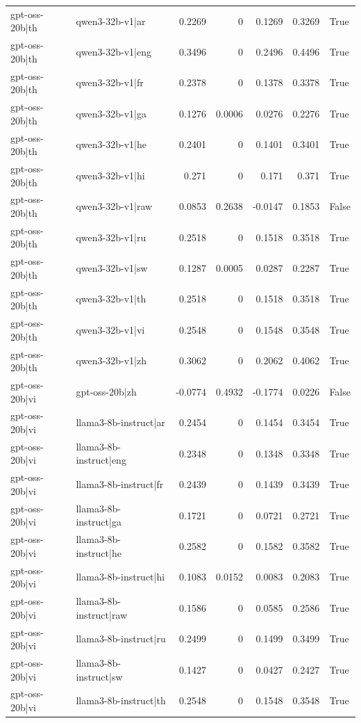 \begin{table}
\begin{tabular}{l l r r r r l}
gpt-oss-20b|th & qwen3-32b-v1|ar & 0.2269 & 0 & 0.1269 & 0.3269 & True \\
gpt-oss-20b|th & qwen3-32b-v1|eng & 0.3496 & 0 & 0.2496 & 0.4496 & True \\
gpt-oss-20b|th & qwen3-32b-v1|fr & 0.2378 & 0 & 0.1378 & 0.3378 & True \\
gpt-oss-20b|th & qwen3-32b-v1|ga & 0.1276 & 0.0006 & 0.0276 & 0.2276 & True \\
gpt-oss-20b|th & qwen3-32b-v1|he & 0.2401 & 0 & 0.1401 & 0.3401 & True \\
gpt-oss-20b|th & qwen3-32b-v1|hi & 0.271 & 0 & 0.171 & 0.371 & True \\
gpt-oss-20b|th & qwen3-32b-v1|raw & 0.0853 & 0.2638 & -0.0147 & 0.1853 & False \\
gpt-oss-20b|th & qwen3-32b-v1|ru & 0.2518 & 0 & 0.1518 & 0.3518 & True \\
gpt-oss-20b|th & qwen3-32b-v1|sw & 0.1287 & 0.0005 & 0.0287 & 0.2287 & True \\
gpt-oss-20b|th & qwen3-32b-v1|th & 0.2518 & 0 & 0.1518 & 0.3518 & True \\
gpt-oss-20b|th & qwen3-32b-v1|vi & 0.2548 & 0 & 0.1548 & 0.3548 & True \\
gpt-oss-20b|th & qwen3-32b-v1|zh & 0.3062 & 0 & 0.2062 & 0.4062 & True \\
gpt-oss-20b|vi & gpt-oss-20b|zh & -0.0774 & 0.4932 & -0.1774 & 0.0226 & False \\
gpt-oss-20b|vi & llama3-8b-instruct|ar & 0.2454 & 0 & 0.1454 & 0.3454 & True \\
gpt-oss-20b|vi & llama3-8b-instruct|eng & 0.2348 & 0 & 0.1348 & 0.3348 & True \\
gpt-oss-20b|vi & llama3-8b-instruct|fr & 0.2439 & 0 & 0.1439 & 0.3439 & True \\
gpt-oss-20b|vi & llama3-8b-instruct|ga & 0.1721 & 0 & 0.0721 & 0.2721 & True \\
gpt-oss-20b|vi & llama3-8b-instruct|he & 0.2582 & 0 & 0.1582 & 0.3582 & True \\
gpt-oss-20b|vi & llama3-8b-instruct|hi & 0.1083 & 0.0152 & 0.0083 & 0.2083 & True \\
gpt-oss-20b|vi & llama3-8b-instruct|raw & 0.1586 & 0 & 0.0585 & 0.2586 & True \\
gpt-oss-20b|vi & llama3-8b-instruct|ru & 0.2499 & 0 & 0.1499 & 0.3499 & True \\
gpt-oss-20b|vi & llama3-8b-instruct|sw & 0.1427 & 0 & 0.0427 & 0.2427 & True \\
gpt-oss-20b|vi & llama3-8b-instruct|th & 0.2548 & 0 & 0.1548 & 0.3548 & True \\

\end{tabular}
\end{table}
